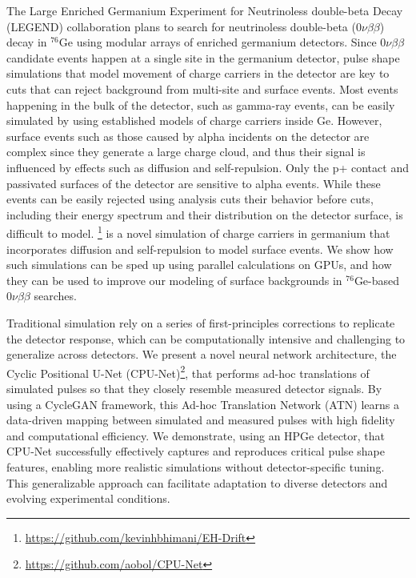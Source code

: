 The Large Enriched Germanium Experiment for Neutrinoless double-beta Decay (LEGEND) collaboration plans to search for neutrinoless double-beta ($0\nu\beta\beta$) decay in ${}^{76}$Ge using modular arrays of enriched germanium detectors. Since $0\nu\beta\beta$ candidate events happen at a single site in the germanium detector, pulse shape simulations that model movement of charge carriers in the detector are key to cuts that can reject background from multi-site and surface events. Most events happening in the bulk of the detector, such as gamma-ray events, can be easily simulated by using established models of charge carriers inside Ge. However, surface events such as those caused by alpha incidents on the detector are complex since they generate a large charge cloud, and thus their signal is influenced by effects such as diffusion and self-repulsion. Only the p+ contact and passivated surfaces of the detector are sensitive to alpha events. While these events can be easily rejected using analysis cuts their behavior before cuts, including their energy spectrum and their distribution on the detector surface, is difficult to model. {\tdsim} \footnote{\url{https://github.com/kevinhbhimani/EH-Drift}} is a novel simulation of charge carriers in germanium that incorporates diffusion and self-repulsion to model surface events. We show how such simulations can be sped up using parallel calculations on GPUs, and how they can be used to improve our modeling of surface backgrounds in ${}^{76}$Ge-based $0\nu\beta\beta$ searches.

Traditional simulation rely on a series of first-principles corrections to replicate the detector response, which can be computationally intensive and challenging to generalize across detectors. We present a novel neural network architecture, the Cyclic Positional U-Net (CPU-Net)\footnote{\url{https://github.com/aobol/CPU-Net}}, that performs ad-hoc translations of simulated pulses so that they closely resemble measured detector signals. By using a CycleGAN framework, this Ad-hoc Translation Network (ATN) learns a data-driven mapping between simulated and measured pulses with high fidelity and computational efficiency. We demonstrate, using an HPGe detector, that CPU-Net successfully effectively captures and reproduces critical pulse shape features, enabling more realistic simulations without detector-specific tuning. This generalizable approach can facilitate adaptation to diverse detectors and evolving experimental conditions.

\clearpage
